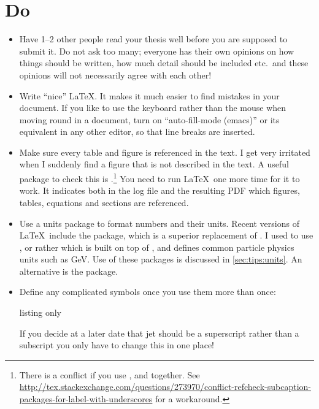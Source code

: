 \section{Do}%
\label{sec:tips:do}

\begin{itemize}
\item Have 1--2 other people read your thesis well before you are
  supposed to submit it. Do not ask too many; everyone has their own
  opinions on how things should be written, how much detail should be
  included etc.\ and these opinions will not necessarily agree with
  each other!

\item Write \enquote{nice} \LaTeX. It makes it much easier to find mistakes
  in your document. If you like to use the keyboard rather than the
  mouse when moving round in a document, turn on \enquote{auto-fill-mode
  (emacs)} or its equivalent in any other editor, so
  that line breaks are inserted.

\item Make sure every table and figure is referenced in the text. I
  get very irritated when I suddenly find a figure that is not
  described in the text. A useful package to check this is
  .\footnote{%
  There is a conflict if you use ,  and  together.
  See \url{http://tex.stackexchange.com/questions/273970/conflict-refcheck-subcaption-packages-for-label-with-underscores} for a workaround.}
  You need to run \LaTeX\ one more time for it to
  work. It indicates both in the log file and the resulting PDF which
  figures, tables, equations and sections are referenced.

\item Use a units package to format numbers and their units. Recent
  versions of \LaTeX\ include the  package, which
  is a superior replacement of . I used to
  use , or rather  which is
  built on top of , and defines common particle
  physics units such as \si{\GeV}. Use of these packages is
  discussed in \cref{sec:tips:units}.
  An alternative is the  package.

\item Define any complicated symbols once you use them more than
  once:
\begin{tcblisting}{listing only}
\newcommand*{\etajet}{\ensuremath{\eta_{\text{jet}}}\xspace}
\end{tcblisting}
  If you decide at a later date that jet should be a superscript
  rather than a subscript you only have to change this in one place!


\end{itemize}
